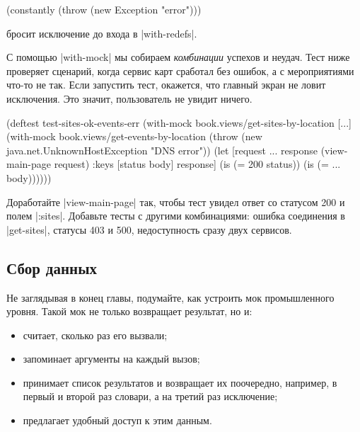 \begin{english}
  \begin{clojure}
(constantly (throw (new Exception "error")))
  \end{clojure}
\end{english}

\noindent
бросит исключение до входа в \spverb|with-redefs|.

С помощью \spverb|with-mock| мы собираем \emph{комбинации} успехов и
неудач. Тест ниже проверяет сценарий, когда сервис карт сработал без ошибок, а с
мероприятиями что-то не так. Если запустить тест, окажется, что главный экран не
ловит исключения. Это значит, пользователь не увидит ничего.

\begin{english}
  \begin{clojure}
(deftest test-sites-ok-events-err
  (with-mock book.views/get-sites-by-location [...]
    (with-mock book.views/get-events-by-location
      (throw (new java.net.UnknownHostException "DNS error"))
      (let [request {...}
            response (view-main-page request)
            {:keys [status body]} response]
        (is (= 200 status))
        (is (= {...} body))))))
  \end{clojure}
\end{english}

Доработайте \spverb|view-main-page| так, чтобы тест увидел ответ со статусом 200
и полем \spverb|:sites|. Добавьте тесты с другими комбинациями: ошибка
соединения в \spverb|get-sites|, статусы 403 и 500, недоступность сразу двух
сервисов.

\subsection{Сбор данных}

Не заглядывая в конец главы, подумайте, как устроить мок промышленного
уровня. Такой мок не только возвращает результат, но и:

\begin{itemize}

\item
  считает, сколько раз его вызвали;

\item
  запоминает аргументы на каждый вызов;

\item
  принимает список результатов и возвращает их поочередно, например, в первый и
  второй раз словари, а на третий раз исключение;

\item
  предлагает удобный доступ к этим данным.

\end{itemize}

